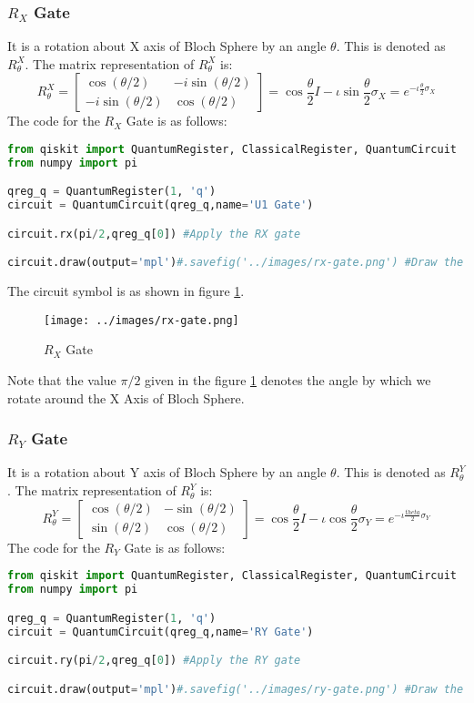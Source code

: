 \documentclass[12pt, oneside]{book}
\theoremstyle{definition}
\theoremstyle{definition}
\theoremstyle{remark}
\begin{document}
\subsubsection{$R_X$ Gate}
It is a rotation about X axis of Bloch Sphere by an angle $\theta$. This is denoted
as $R^{X}_{\theta}$.
The matrix representation of $R^{X}_{\theta}$ is:
\[
    R^{X}_{\theta}=\begin{bmatrix}
        \cos(\theta/2) & -i\sin(\theta/2) \\
        -i\sin(\theta/2) & \cos(\theta/2)
    \end{bmatrix}=\cos \frac{\theta}{2}I-\iota \sin\frac{\theta}{2}\sigma_X=e^{-\iota\frac{\theta}{2}\sigma_X}
\]
The code for the $R_X$ Gate is as follows:
\begin{lstlisting}[language=Python]
from qiskit import QuantumRegister, ClassicalRegister, QuantumCircuit
from numpy import pi

qreg_q = QuantumRegister(1, 'q')
circuit = QuantumCircuit(qreg_q,name='U1 Gate')

circuit.rx(pi/2,qreg_q[0]) #Apply the RX gate

circuit.draw(output='mpl')#.savefig('../images/rx-gate.png') #Draw the circuit
\end{lstlisting}

The circuit symbol is as shown in figure \ref{fig:rx}.
\begin{figure}[H]
    \centering
    \texttt{[image: ../images/rx-gate.png]}
    \caption{$R_X$ Gate}
    \label{fig:rx}
\end{figure}
Note that the value $\pi/2$ given in the figure \ref{fig:rx} denotes the angle by which we rotate around the X Axis of Bloch Sphere.

\subsubsection{$R_Y$ Gate}
It is a rotation about Y axis of Bloch Sphere by an angle $\theta$. This is denoted
as $R^{Y}_{\theta}$.
The matrix representation of $R^{Y}_{\theta}$ is:
\[
    R^{Y}_{\theta}=\begin{bmatrix}
        \cos(\theta/2) & -\sin(\theta/2) \\
        \sin(\theta/2) & \cos(\theta/2)
    \end{bmatrix}= \cos \frac{\theta}{2}I-\iota \cos \frac{\theta}{2}\sigma_Y=e^{-\iota \frac{theta}{2}\sigma_Y}
\]
The code for the $R_Y$ Gate is as follows:
\begin{lstlisting}[language=Python]
from qiskit import QuantumRegister, ClassicalRegister, QuantumCircuit
from numpy import pi

qreg_q = QuantumRegister(1, 'q')
circuit = QuantumCircuit(qreg_q,name='RY Gate')

circuit.ry(pi/2,qreg_q[0]) #Apply the RY gate

circuit.draw(output='mpl')#.savefig('../images/ry-gate.png') #Draw the circuit
\end{lstlisting}
\end{document}
